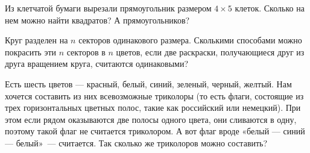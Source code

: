 ﻿
\begin{enumerate}
\itA Из клетчатой бумаги вырезали прямоугольник размером $4 \times 5$ клеток. Сколько на нем можно найти квадратов? А прямоугольников?

\itB Круг разделен на $n$ секторов одинакового размера. Сколькими способами можно покрасить эти $n$ секторов в $n$ цветов, если две раскраски, получающиеся друг из друга вращением круга, считаются одинаковыми?

\itC Есть шесть цветов — красный, белый, синий, зеленый, черный, желтый. Нам хочется составить из них всевозможные триколоры (то есть флаги, состоящие из трех горизонтальных цветных полос, такие как российский или немецкий). При этом если рядом оказываются две полосы одного цвета, они сливаются в одну, поэтому такой флаг не считается триколором. А вот флаг вроде «белый — синий — белый»~— считается. Так сколько же триколоров можно составить?
\end{enumerate}